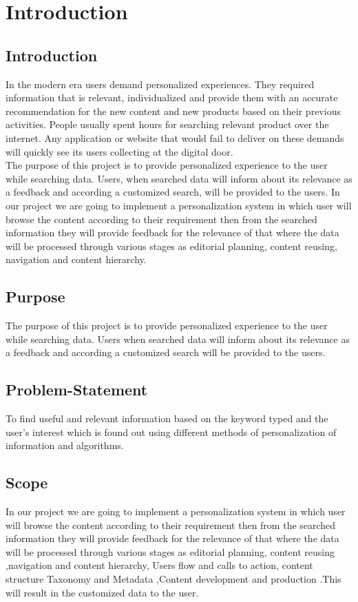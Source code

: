 \newpage
\chapter{Introduction}

\section{Introduction}
In the modern era users demand personalized experiences. They required information that is relevant, individualized and provide them with an accurate recommendation for the new content and new products based on their previous activities. People usually spent hours for searching relevant product over the internet. Any application or website that would fail to deliver on these demands will quickly see its users collecting at the digital door.\\
The purpose of this project is to provide personalized experience to the user while searching data. Users, when searched data will inform about its relevance as a feedback and according a customized search, will be provided to the users. In our project we are going to implement a personalization system in which user will browse the content according to their requirement then from the searched information they will provide feedback for the relevance of that where the data will be processed through various stages as editorial planning, content reusing, navigation and content hierarchy.

\section{Purpose}
The purpose of this project is to provide personalized experience to the user while searching data. Users when searched data will inform about its relevance as a feedback and according a customized search will be provided to the users.


\section{Problem-Statement}
To find useful and relevant information based on the keyword typed and the user’s interest which is found out using different methods of personalization of information and algorithms.
\section{Scope}
In our project we are going to implement a personalization system in which user will browse the content according to their requirement then from the searched information they will provide feedback for the relevance of that where the data will be processed through various stages as editorial planning, content reusing ,navigation and content hierarchy, Users flow and calls to action, content structure Taxonomy and Metadata ,Content development and production .This will result in the customized data to the user.
